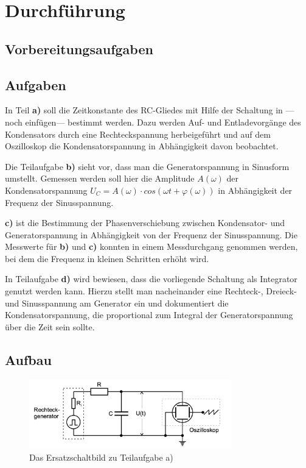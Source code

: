 \section{Durchführung}
\label{sec:Durchfuehrung}

\subsection{Vorbereitungsaufgaben}



\subsection{Aufgaben}
\label{subsec:Aufgaben}

In Teil \textbf{a)} soll die Zeitkonstante des RC-Gliedes mit Hilfe der Schaltung in
---noch einfügen--- bestimmt werden. 
Dazu werden Auf- und Entladevorgänge des Kondensators 
durch eine Rechteckspannung herbeigeführt und auf dem Oszilloskop die Kondensatorspannung in 
Abhängigkeit davon beobachtet.

Die Teilaufgabe \textbf{b)} sieht vor, dass man die Generatorspannung in Sinusform umstellt.
Gemessen werden soll hier die Amplitude $A(\omega)$ der Kondensatorspannung
 $U_C = A(\omega) \cdot cos(\omega t + \varphi(\omega))$ in Abhängigkeit der Frequenz
der Sinusspannung.

\textbf{c)} ist die Bestimmung der Phasenverschiebung zwischen Kondensator- und 
Generatorspannung in Abhängigkeit von der Frequenz der Sinusspannung. Die Messwerte für \textbf{b)} und \textbf{c)} konnten in einem 
Messdurchgang genommen werden, bei dem die Frequenz in kleinen Schritten erhöht wird.

In Teilaufgabe \textbf{d)} wird bewiesen, dass die vorliegende Schaltung als Integrator genutzt werden kann.
Hierzu stellt man nacheinander eine Rechteck-, Dreieck- und Sinusspannung am Generator ein und dokumentiert 
die Kondensatorspannung, die proportional zum Integral der Generatorspannung über die Zeit sein sollte.



\subsection{Aufbau}
\label{subsec:Aufbau}

\begin{figure}
    \centering
    \includegraphics[height=3cm]{esb1}
    \caption{Das Ersatzschaltbild zu Teilaufgabe a)}
\end{figure}

